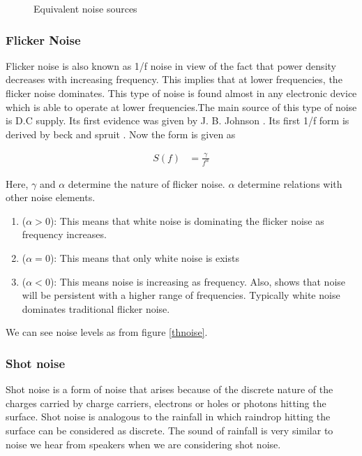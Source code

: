 \documentclass[12pt]{article}
\begin{document}
\begin{figure}[hbt!]
\caption{Equivalent noise sources}
\end{figure}

\subsubsection{Flicker Noise \label{thflicker}}

Flicker noise is also known as 1/f noise in view of the fact that power density decreases with increasing frequency. This implies that at lower frequencies, the flicker noise dominates.
This type of noise is found  almost in any electronic device which is able to operate at lower frequencies.The main source of this type of noise is D.C supply. Its first evidence was given by J. B. Johnson \cite{j b johnson}. Its first 1/f form is derived by beck and spruit \cite{beck and spruit}. Now the form is given as 

\begin{align}
S(f) & = \frac{\gamma}{f^{\alpha}}
\end{align}

Here, $\gamma$ and $\alpha$ determine the nature of flicker noise. $\alpha$ determine relations with other noise elements.

\begin{enumerate}
\item ($\alpha > 0$): This means that white noise is dominating the flicker noise as frequency increases.
\item ($\alpha = 0$): This means that only white noise is exists
\item ($\alpha < 0$): This means noise is increasing as frequency. Also, shows that noise will be persistent with a higher range of frequencies. Typically white noise dominates traditional flicker noise.
\end{enumerate}

We can see noise levels as from figure \ref{thnoise}.

\subsubsection{Shot noise \label{thshot}}

Shot noise is a form of noise that arises because of the discrete nature of the charges carried by charge carriers, electrons or holes or photons hitting the surface. Shot noise is analogous to the rainfall in which raindrop hitting the surface can be considered as discrete. The sound of rainfall is very similar to noise we hear from speakers when we are considering shot noise. 
\end{document}
